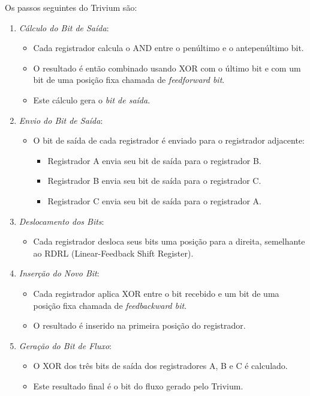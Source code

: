 Os passos seguintes do Trivium são:
\begin{enumerate}
    \item {\em Cálculo do Bit de Saída}:
    \begin{itemize}
        \item Cada registrador calcula o AND entre o penúltimo e o antepenúltimo bit.
        \item O resultado é então combinado usando XOR com o último bit e com um bit de uma posição fixa chamada de \textit{feedforward bit}.
        \item Este cálculo gera o \textit{bit de saída}.
    \end{itemize}
    
    \item {\em Envio do Bit de Saída}:
    \begin{itemize}
        \item O bit de saída de cada registrador é enviado para o registrador adjacente:
        \begin{itemize}
            \item Registrador A envia seu bit de saída para o registrador B.
            \item Registrador B envia seu bit de saída para o registrador C.
            \item Registrador C envia seu bit de saída para o registrador A.
        \end{itemize}
    \end{itemize}
    
    \item {\em Deslocamento dos Bits}:
    \begin{itemize}
        \item Cada registrador desloca seus bits uma posição para a direita, semelhante ao RDRL (Linear-Feedback Shift Register).
    \end{itemize}
    
    \item {\em Inserção do Novo Bit}:
    \begin{itemize}
        \item Cada registrador aplica XOR entre o bit recebido e um bit de uma posição fixa chamada de \textit{feedbackward bit}.
        \item O resultado é inserido na primeira posição do registrador.
    \end{itemize}
    
    \item {\em Geração do Bit de Fluxo}:
    \begin{itemize}
        \item O XOR dos três bits de saída dos registradores A, B e C é calculado.
        \item Este resultado final é o bit do fluxo gerado pelo Trivium.
    \end{itemize}
\end{enumerate}

